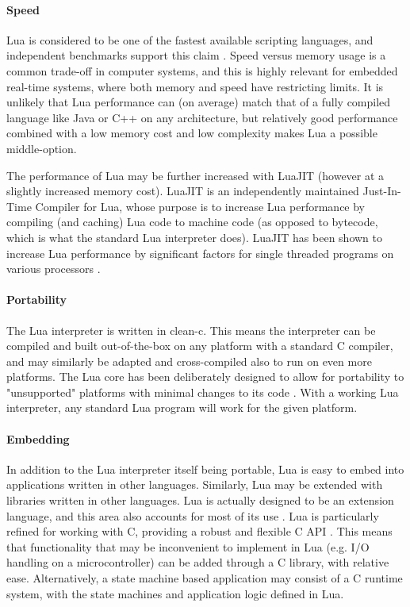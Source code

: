 \paragraph{Speed}
Lua is considered to be one of the fastest available scripting languages, and independent benchmarks support this claim \cite{website:computer_language_benchmarks_game}. Speed versus memory usage is a common trade-off in computer systems, and this is highly relevant for embedded real-time systems, where both memory and speed have restricting limits. It is unlikely that Lua performance can (on average) match that of a fully compiled language like Java or C++ on any architecture, but relatively good performance combined with a low memory cost and low complexity makes Lua a possible middle-option.

The performance of Lua may be further increased with LuaJIT (however at a slightly increased memory cost). LuaJIT is an independently maintained Just-In-Time Compiler for Lua, whose purpose is to increase Lua performance by compiling (and caching) Lua code to machine code (as opposed to bytecode, which is what the standard Lua interpreter does). LuaJIT has been shown to increase Lua performance by significant factors for single threaded programs on various processors \cite{website:luajit_performance}. 

\paragraph{Portability}
The Lua interpreter is written in \gls{clean-c}. This means the interpreter can be compiled and built out-of-the-box on any platform with a standard C compiler, and may similarly be adapted and cross-compiled also to run on even more platforms. The Lua core has been deliberately designed to allow for portability to "unsupported" platforms with minimal changes to its code \cite{chapter:porting_lua_microcontroller}. With a working Lua interpreter, any standard Lua program will work for the given platform.

\paragraph{Embedding}
In addition to the Lua interpreter itself being portable, Lua is easy to embed into applications written in other languages. Similarly, Lua may be extended with libraries written in other languages. Lua is actually designed to be an extension language, and this area also accounts for most of its use \cite{website:where_lua_is_used}. Lua is particularly refined for working with C, providing a robust and flexible C API \cite[ch. 24]{book:programming_in_lua_first}. This means that functionality that may be inconvenient to implement in Lua (e.g. I/O handling on a microcontroller) can be added through a C library, with relative ease. Alternatively, a state machine based application may consist of a C runtime system, with the state machines and application logic defined in Lua.

